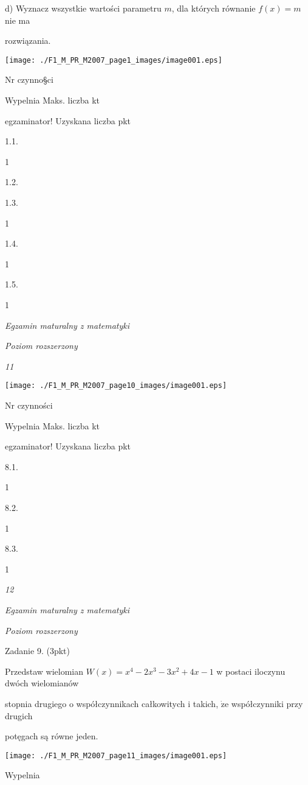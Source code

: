 \documentclass[a4paper,12pt]{article}
\begin{document}
d) Wyznacz wszystkie wartości parametru $m$, dla których równanie $f(x)=m$ nie ma

rozwiązania.
\begin{center}
\texttt{[image: ./F1\_M\_PR\_M2007\_page1\_images/image001.eps]}
\end{center}
Nr czynno\S ci

Wypelnia Maks. liczba kt

egzaminator! Uzyskana liczba pkt

1.1.

1

1.2.

1.3.

1

1.4.

1

1.5.

1





{\it Egzamin maturalny z matematyki}

{\it Poziom rozszerzony}

{\it 11}
\begin{center}
\texttt{[image: ./F1\_M\_PR\_M2007\_page10\_images/image001.eps]}
\end{center}
Nr czynności

Wypelnia Maks. liczba kt

egzaminator! Uzyskana liczba pkt

8.1.

1

8.2.

1

8.3.

1





{\it 12}

{\it Egzamin maturalny z matematyki}

{\it Poziom rozszerzony}

Zadanie 9. (3pkt)

Przedstaw wielomian $W(x)=x^{4}-2x^{3}-3x^{2}+4x-1$ w postaci iloczynu dwóch wielomianów

stopnia drugiego o współczynnikach całkowitych i takich, $\dot{\mathrm{z}}\mathrm{e}$ współczynniki przy drugich

potęgach są równe jeden.
\begin{center}
\texttt{[image: ./F1\_M\_PR\_M2007\_page11\_images/image001.eps]}
\end{center}
Wypelnia
\end{document}

